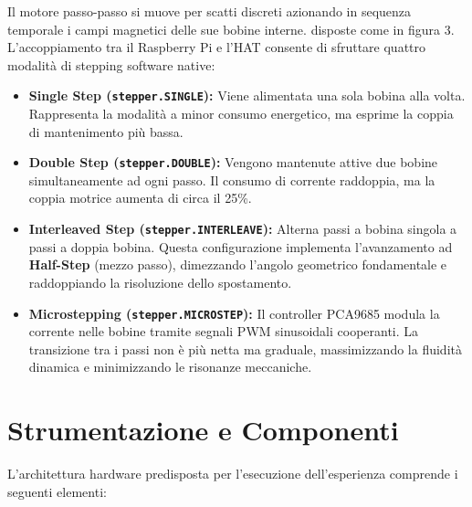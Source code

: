 \documentclass{article}
\begin{document}
\newpage

\noindent Il motore passo-passo si muove per scatti discreti azionando in sequenza temporale i campi magnetici delle sue bobine interne. disposte come in figura 3. L'accoppiamento tra il Raspberry Pi e l'HAT consente di sfruttare quattro modalità di stepping software native:


\begin{itemize}
\item \textbf{Single Step (\texttt{stepper.SINGLE}):} Viene alimentata una sola bobina alla volta. Rappresenta la modalità a minor consumo energetico, ma esprime la coppia di mantenimento più bassa.
\item \textbf{Double Step (\texttt{stepper.DOUBLE}):} Vengono mantenute attive due bobine simultaneamente ad ogni passo. Il consumo di corrente raddoppia, ma la coppia motrice aumenta di circa il 25\%.
\item \textbf{Interleaved Step (\texttt{stepper.INTERLEAVE}):} Alterna passi a bobina singola a passi a doppia bobina. Questa configurazione implementa l'avanzamento ad \textbf{Half-Step} (mezzo passo), dimezzando l'angolo geometrico fondamentale e raddoppiando la risoluzione dello spostamento.
\item \textbf{Microstepping (\texttt{stepper.MICROSTEP}):} Il controller PCA9685 modula la corrente nelle bobine tramite segnali PWM sinusoidali cooperanti. La transizione tra i passi non è più netta ma graduale, massimizzando la fluidità dinamica e minimizzando le risonanze meccaniche.
\end{itemize}

\section{Strumentazione e Componenti}
L'architettura hardware predisposta per l'esecuzione dell'esperienza comprende i seguenti elementi:
\end{document}
